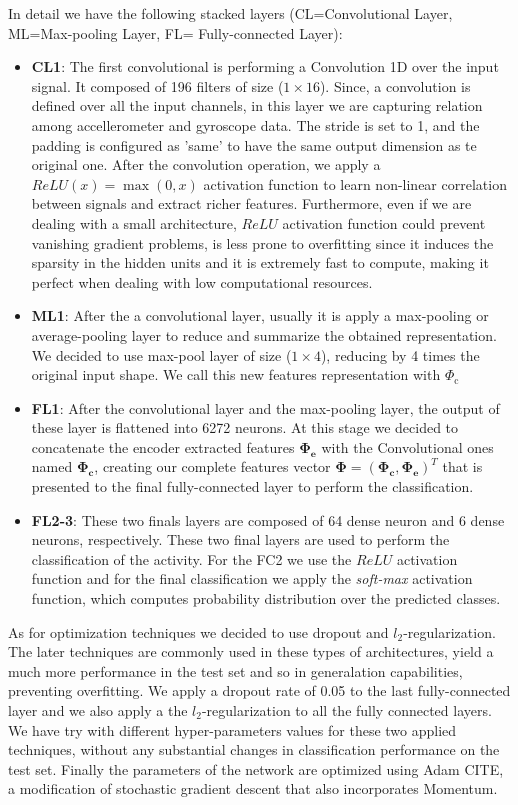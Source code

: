 In detail we have the following stacked layers (CL=Convolutional Layer, ML=Max-pooling Layer, FL= Fully-connected Layer):
\begin{itemize}
	\item \textbf{CL1}: The first convolutional is performing a Convolution 1D over the input signal. It composed of 196 filters of size ($1\times16$). Since, a convolution is defined over all the input channels, in this layer we are capturing relation among accellerometer and gyroscope data. The stride is set to 1, and the padding is configured as 'same' to have the same output dimension as te original one. After the convolution operation, we apply a $ReLU(x)=\max(0,x)$ activation function to learn non-linear correlation between signals and extract richer features. Furthermore, even if we are dealing with a small architecture, $ReLU$ activation function could prevent vanishing gradient problems, is less prone to overfitting since it induces the sparsity in the hidden units and it is extremely fast to compute, making it perfect when dealing with low computational resources.
	\item \textbf{ML1}: After the a convolutional layer, usually it is apply a max-pooling or average-pooling layer to reduce and summarize the obtained representation. We decided to use max-pool layer of size ($1\times4$), reducing by 4 times the original input shape. We call this new features representation with $ \Phi_{\text{c}} $
	\item \textbf{FL1}: After the convolutional layer and the max-pooling layer, the output of these layer is flattened into 6272 neurons. At this stage we decided to concatenate the encoder extracted features $ \boldsymbol{\Phi_{\text{e}}} $ with the Convolutional ones named $\boldsymbol{\Phi_{\text{c}}}$, creating our complete features vector $\boldsymbol{\Phi} = (\boldsymbol{\Phi_{\text{c}}}, \boldsymbol{\Phi_{\text{e}}})^T$ that is presented to the final fully-connected layer to perform the classification.
	\item \textbf{FL2-3}: These two finals layers are composed of 64 dense neuron and 6 dense neurons, respectively. These two final layers are used to perform the classification of the activity. For the FC2 we use the $ReLU$ activation function and for the final classification we apply the \textit{soft-max} activation function, which computes probability distribution over the predicted classes.
\end{itemize}

As for optimization techniques we decided to use dropout and $l_2$-regularization. The later techniques are commonly used in these types of architectures, yield a much more performance in the test set and so in generalation capabilities, preventing overfitting. We apply a dropout rate of 0.05 to the last fully-connected layer and we also apply a the $l_2$-regularization to all the fully connected layers. We have try with different hyper-parameters values for these two applied techniques, without any substantial changes in classification performance on the test set. Finally the parameters of the network are optimized using Adam CITE, a modification of stochastic gradient descent that also incorporates Momentum.
